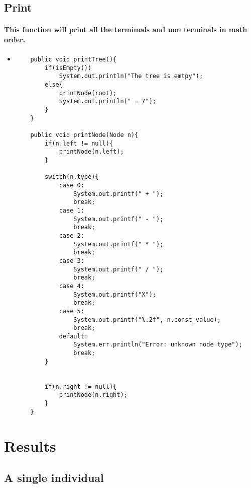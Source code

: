 \documentclass[12pt]{article}
\begin{document}
	\subsection{Print}
	\paragraph{This function will print all the termimals and non terminals in math order.}
	\begin{itemize}
	\item
	\begin{lstlisting}
    public void printTree(){
        if(isEmpty())
            System.out.println("The tree is emtpy");
        else{
            printNode(root);
            System.out.println(" = ?");
        }
    }
    
    public void printNode(Node n){
        if(n.left != null){
            printNode(n.left);
        }
        
        switch(n.type){
            case 0:
                System.out.printf(" + ");
                break;
            case 1:
                System.out.printf(" - ");
                break;
            case 2:
                System.out.printf(" * ");
                break;
            case 3: 
                System.out.printf(" / ");
                break;
            case 4:
                System.out.printf("X");
                break;
            case 5:
                System.out.printf("%.2f", n.const_value);
                break;
            default:
                System.err.println("Error: unknown node type");
                break;
        }
        
        
        if(n.right != null){
            printNode(n.right);
        }
    }
	\end{lstlisting}
	\end{itemize}

\section{Results}
	\subsection{A single individual}
\end{document}

